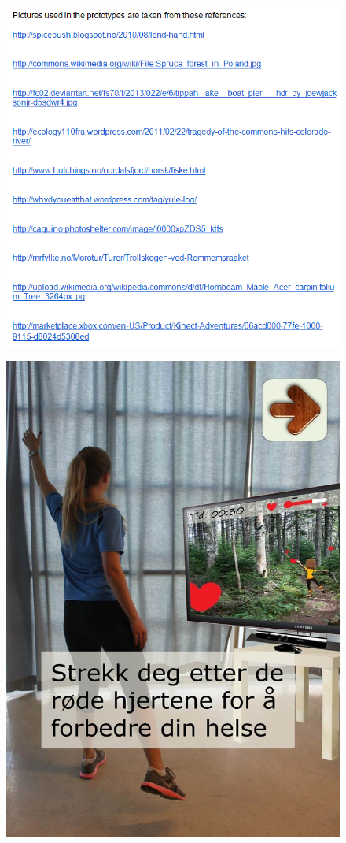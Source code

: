 \begin{figure} [H]
\centering
\includegraphics[scale=0.71]{kilderprototype}
\label{fig:kilder}
\end{figure}

\begin{figure} [H]
\centering
\includegraphics[scale=0.7]{KineIntro.jpg}
\label{fig:kineintroNorsk}
\end{figure}

